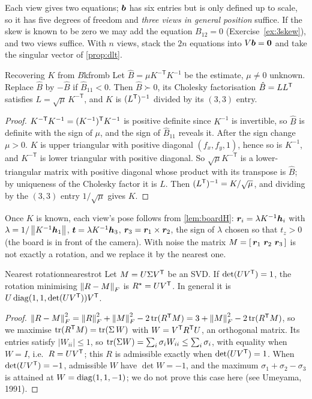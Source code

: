 Each view gives two equations; $\bm{b}$ has six entries but is only
defined up to scale, so it has five degrees of freedom and \emph{three
views in general position} suffice. If the skew is known to be zero we
may add the equation $B_{12}=0$ (Exercise~\ref{ex:3skew}), and two views
suffice. With $n$ views, stack the $2n$ equations into $V\bm{b}=\bm{0}$
and take the singular vector of \cref{prop:dlt}.

\begin{proposition}{Recovering $K$ from $B$}{kfromb}
Let $\hat B=\mu K^{-\mathsf T}K^{-1}$ be the estimate, $\mu\neq0$
unknown. Replace $\hat B$ by $-\hat B$ if $\hat B_{11}<0$. Then
$\hat B\succ0$, its Cholesky factorisation $\hat B=LL^{\mathsf{T}}$ satisfies
$L=\sqrt{\mu}\,K^{-\mathsf T}$, and $K$ is $(L^{\mathsf{T}})^{-1}$ divided by its
$(3,3)$ entry.
\end{proposition}

\begin{proof}
$K^{-\mathsf T}K^{-1}=(K^{-1})^{\mathsf{T}} K^{-1}$ is positive definite since
$K^{-1}$ is invertible, so $\hat B$ is definite with the sign of $\mu$,
and the sign of $\hat B_{11}$ reveals it. After the sign change $\mu>0$.
$K$ is upper triangular with positive diagonal $(f_x,f_y,1)$, hence so
is $K^{-1}$, and $K^{-\mathsf T}$ is lower triangular with positive
diagonal. So $\sqrt\mu K^{-\mathsf T}$ is a lower-triangular matrix with
positive diagonal whose product with its transpose is $\hat B$; by
uniqueness of the Cholesky factor it is $L$. Then $(L^{\mathsf{T}})^{-1}=K/
\sqrt\mu$, and dividing by the $(3,3)$ entry $1/\sqrt\mu$ gives $K$.
\end{proof}

Once $K$ is known, each view's pose follows from \cref{lem:boardH}:
$\bm{r}_i=\lambda K^{-1}\bm{h}_i$ with $\lambda=1/\left\lVert K^{-1}
\bm{h}_1\right\rVert$, $\bm{t}=\lambda K^{-1}\bm{h}_3$, $\bm{r}_3=
\bm{r}_1\times\bm{r}_2$, the sign of $\lambda$ chosen so that
$t_z>0$ (the board is in front of the camera). With noise the matrix
$M=[\,\bm{r}_1\ \bm{r}_2\ \bm{r}_3\,]$ is not exactly a rotation,
and we replace it by the nearest one.

\begin{lemma}{Nearest rotation}{nearestrot}
Let $M=U\Sigma V^{\mathsf{T}}$ be an SVD. If $\det(UV^{\mathsf{T}})=1$, the rotation
minimising $\left\lVert R-M\right\rVert_F$ is $R^\star=UV^{\mathsf{T}}$. In general it is
$U\operatorname{diag}(1,1,\det(UV^{\mathsf{T}}))V^{\mathsf{T}}$.
\end{lemma}

\begin{proof}
$\left\lVert R-M\right\rVert_F^2=\left\lVert R\right\rVert_F^2+\left\lVert M\right\rVert_F^2-2\operatorname{tr}(R^{\mathsf{T}} M)=3+\left\lVert M\right\rVert_F^2-2\operatorname{tr}
(R^{\mathsf{T}} M)$, so we maximise $\operatorname{tr}(R^{\mathsf{T}} M)=\operatorname{tr}(\Sigma\,W)$ with
$W=V^{\mathsf{T}} R^{\mathsf{T}} U$, an orthogonal matrix. Its entries satisfy $|W_{ii}|\le1$,
so $\operatorname{tr}(\Sigma W)=\sum_i\sigma_iW_{ii}\le\sum_i\sigma_i$, with equality
when $W=I$, i.e.\ $R=UV^{\mathsf{T}}$; this $R$ is admissible exactly when
$\det(UV^{\mathsf{T}})=1$. When $\det(UV^{\mathsf{T}})=-1$, admissible $W$ have
$\det W=-1$, and the maximum $\sigma_1+\sigma_2-\sigma_3$ is attained at
$W=\operatorname{diag}(1,1,-1)$; we do not prove this case here (see Umeyama, 1991).
\end{proof}

